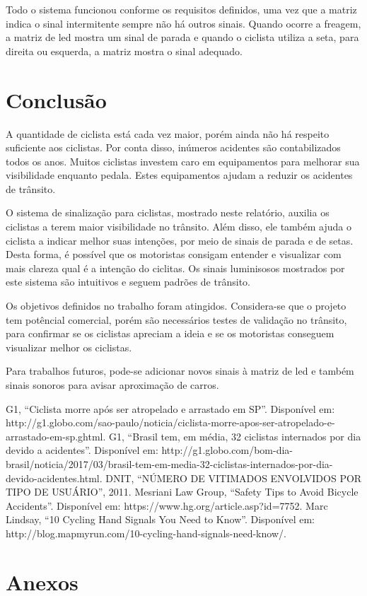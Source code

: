 \documentclass[conference]{IEEEtran}
\begin{document}
Todo o sistema funcionou conforme os requisitos definidos, uma vez que a matriz indica o sinal intermitente sempre não há outros sinais. Quando ocorre a freagem, a matriz de led mostra um sinal de parada e quando o ciclista utiliza a seta, para direita ou esquerda, a matriz mostra o sinal adequado.


\section{Conclusão}
A quantidade de ciclista está cada vez maior, porém ainda não há respeito suficiente aos ciclistas. Por conta disso, inúmeros acidentes são contabilizados todos os anos. Muitos ciclistas investem caro em equipamentos para melhorar sua visibilidade enquanto pedala. Estes equipamentos ajudam a reduzir os acidentes de trânsito.

O sistema de sinalização para ciclistas, mostrado neste relatório, auxilia os ciclistas a terem maior visibilidade no trânsito. Além disso, ele também ajuda o ciclista a indicar melhor suas intenções, por meio de sinais de parada e de setas. Desta forma, é possível que os motoristas consigam entender e visualizar com mais clareza qual é a intenção do ciclitas. Os sinais luminisosos mostrados por este sistema são intuitivos e seguem padrões de trânsito.

Os objetivos definidos no trabalho foram atingidos. Considera-se que o projeto tem potêncial comercial, porém são necessários testes de validação no trânsito, para confirmar se os ciclistas apreciam a ideia e se os motoristas conseguem visualizar melhor os ciclistas. 

Para trabalhos futuros, pode-se adicionar novos sinais à matriz de led e também sinais sonoros para avisar aproximação de carros. 


\begin{thebibliography}{00}
   G1, ``Ciclista morre após ser atropelado e arrastado em SP''. Disponível em: http://g1.globo.com/sao-paulo/noticia/ciclista-morre-apos-ser-atropelado-e-arrastado-em-sp.ghtml.
   G1, ``Brasil tem, em média, 32 ciclistas internados por dia devido a acidentes''. Disponível em: http://g1.globo.com/bom-dia-brasil/noticia/2017/03/brasil-tem-em-media-32-ciclistas-internados-por-dia-devido-acidentes.html.
   DNIT, ``NÚMERO DE VITIMADOS ENVOLVIDOS POR TIPO DE USUÁRIO'', 2011.
   Mesriani Law Group, ``Safety Tips to Avoid Bicycle Accidents''. Disponível em: https://www.hg.org/article.asp?id=7752.
   Marc Lindsay, ``10 Cycling Hand Signals You Need to Know''. Disponível em: http://blog.mapmyrun.com/10-cycling-hand-signals-need-know/.

\end{thebibliography}

\newpage

\section{Anexos}


\end{document}
